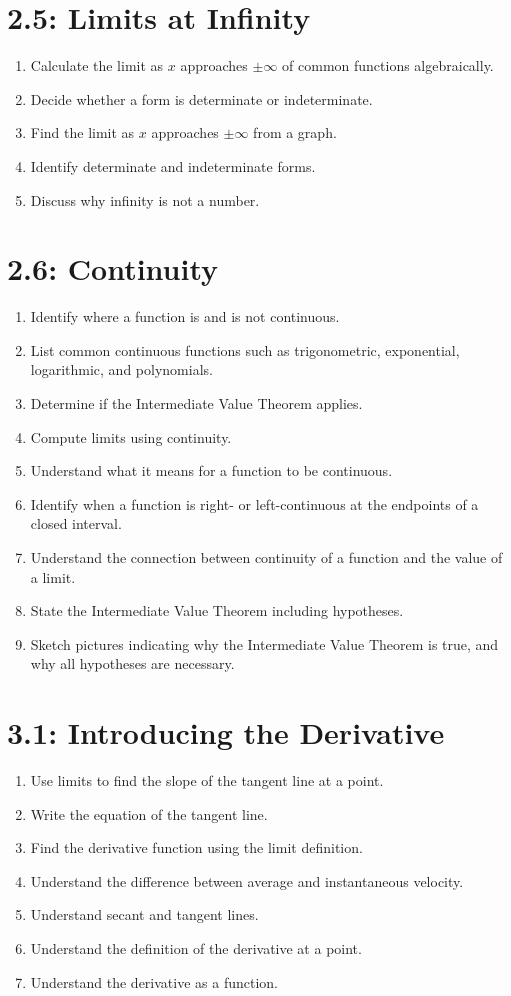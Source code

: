 \documentclass[11pt]{article}
\begin{document}
\section*{2.5: Limits at Infinity}
\begin{enumerate}
	\item Calculate the limit as $x$ approaches $\pm \infty$ of common functions algebraically.
	\item Decide whether a form is determinate or indeterminate.
	\item Find the limit as $x$ approaches $\pm \infty$ from a graph.
	\item Identify determinate and indeterminate forms.
	\item Discuss why infinity is not a number.
\end{enumerate}


\section*{2.6: Continuity}
\begin{enumerate}
	\item Identify where a function is and is not continuous.
	\item List common continuous functions such as trigonometric, exponential, logarithmic, and polynomials.
	\item Determine if the Intermediate Value Theorem applies.
	\item Compute limits using continuity.
	\item Understand what it means for a function to be continuous.
	\item Identify when a function is right- or left-continuous at the endpoints of a closed interval.
	\item Understand the connection between continuity of a function and the value of a limit.
	\item State the Intermediate Value Theorem including hypotheses.
	\item Sketch pictures indicating why the Intermediate Value Theorem is true, and why all hypotheses are necessary.
\end{enumerate}

\section*{3.1: Introducing the Derivative}
\begin{enumerate}
	\item Use limits to find the slope of the tangent line at a point.
	\item Write the equation of the tangent line.
	\item Find the derivative function using the limit definition.
	\item Understand the difference between average and instantaneous velocity.
	\item Understand secant and tangent lines.
	\item Understand the definition of the derivative at a point.
	\item Understand the derivative as a function.
\end{enumerate}
\end{document}
